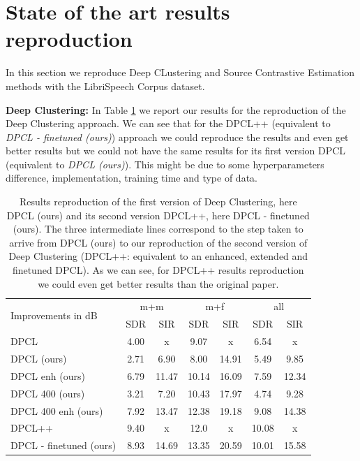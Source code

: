 \documentclass[master, tikz, final,11pt, dvipdfmx]{iscs-thesis}
\begin{document}
\section{State of the art results reproduction}
\label{sota}

In this section we reproduce Deep CLustering and Source Contrastive Estimation methods with the LibriSpeech Corpus dataset.

\textbf{Deep Clustering:} In Table \ref{table:DPCLreprod} we report our results for the reproduction of the Deep Clustering approach. We can see that for the DPCL++ \cite{DPCLV2} (equivalent to \textit{DPCL - finetuned (ours)}) approach we could reproduce the results and even get better results but we could not have the same results for its first version DPCL \cite{DPCLV1} (equivalent to \textit{DPCL (ours)}). This might be due to some hyperparameters difference, implementation, training time and type of data.


\begin{table}[h!]
\centering
\begin{tabular}{l|c|c|c|c|c|c}
\multirow{2}{*}{Improvements in dB} & \multicolumn{2}{c|}{m+m} & \multicolumn{2}{c|}{m+f} & \multicolumn{2}{c}{all} \\ 
\cline{2-7} 
 & SDR & SIR & SDR & SIR & SDR & SIR \\ 
\hline 
DPCL \cite{DPCLV1} & 4.00 & x & 9.07 & x & 6.54 & x \\ 
DPCL (ours) & 2.71 & 6.90 & 8.00 & 14.91 & 5.49 & 9.85 
\\ 
\hline 
\hline 
DPCL enh (ours) & 6.79 & 11.47 & 10.14 & 16.09 & 7.59 & 12.34 \\ 
DPCL 400 (ours) & 3.21 & 7.20 & 10.43 & 17.97 & 4.74 & 9.28 \\ 
DPCL 400 enh (ours) & 7.92 & 13.47 & 12.38 & 19.18 & 9.08 & 14.38 \\ 
\hline 
\hline 
DPCL++ \cite{DPCLV2} & 9.40 & x & 12.0 & x & 10.08 & x \\ 
DPCL - finetuned (ours) &  8.93 & 14.69 & 13.35 & 20.59 & 10.01 & 15.58 \\ 
\end{tabular}
\caption[Deep Clustering results reproduction]{Results reproduction of the first version of Deep Clustering, here DPCL (ours) and its second version DPCL++, here DPCL - finetuned (ours). The three intermediate lines correspond to the step taken to arrive from DPCL (ours) to our reproduction of the second version of Deep Clustering (DPCL++: equivalent to an enhanced, extended and finetuned DPCL). As we can see, for DPCL++ results reproduction we could even get better results than the original paper.}
\label{table:DPCLreprod}
\end{table}
\end{document}
